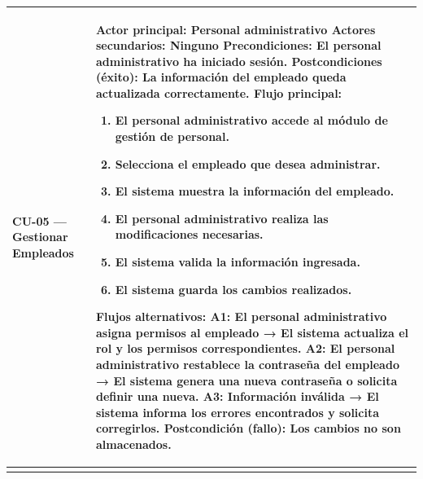 \documentclass[
]{article}
\newcounter{none} %
\begin{document}
{\def\LTcaptype{none} %
\begin{longtable}[]{|
  >{\raggedright\arraybackslash}p{}|
  >{\raggedright\arraybackslash}p{}|}
\hline
\begin{minipage}[b]{\linewidth}\raggedright
\textbf{CU-05 --- Gestionar Empleados}
\end{minipage} & \begin{minipage}[b]{\linewidth}\raggedright
\textbf{Actor principal:} Personal administrativo \textbf{Actores secundarios:}
Ninguno \textbf{Precondiciones:} El personal administrativo ha iniciado sesión. \textbf{Postcondiciones (éxito):} La información del empleado queda
actualizada correctamente. \textbf{Flujo principal:}

\begin{enumerate}
\def\labelenumi{\arabic{enumi}.}
\item
  El personal administrativo accede al módulo de gestión de personal.
\item
  Selecciona el empleado que desea administrar.
\item
  El sistema muestra la información del empleado.
\item
  El personal administrativo realiza las modificaciones necesarias.
\item
  El sistema valida la información ingresada.
\item
  El sistema guarda los cambios realizados.
\end{enumerate}

\textbf{Flujos alternativos:} A1: El personal administrativo asigna permisos al empleado → El sistema actualiza
el rol y los permisos correspondientes. A2: El personal administrativo restablece la contraseña del empleado → El sistema
genera una nueva contraseña o solicita definir una nueva. A3: Información inválida → El sistema informa los errores encontrados y
solicita corregirlos. \textbf{Postcondición (fallo):} Los cambios no son almacenados.
\end{minipage} \\
\hline
\endhead
\hline
\endlastfoot
\end{longtable}
}
\end{document}
